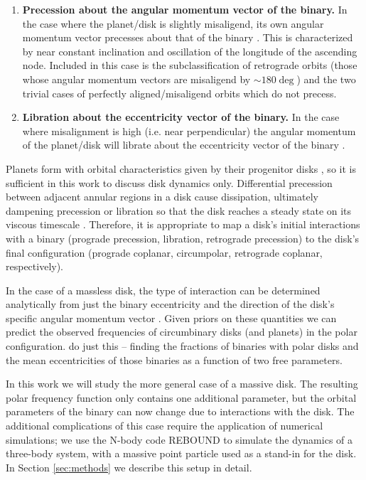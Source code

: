 \documentclass[twocolumn]{aastex631}
\begin{document}
\begin{enumerate}
    \item {\bf Precession about the angular momentum vector of the binary.} In the case where the planet/disk
        is slightly misaligend, its own angular momentum vector precesses about that of the binary \citep[e.g.,][]{bate2000,lubow2000}.
        This is characterized by near constant
        inclination and oscillation of the longitude of the ascending node. Included in this case is the subclassification
        of retrograde orbits (those whose angular momentum vectors are misaligend by $\sim 180 \deg$) and the two
        trivial cases of perfectly aligned/misaligend orbits which do not precess. \label{enum:precession}
    \item {\bf Libration about the eccentricity vector of the binary.} In the case where misalignment is high (i.e. near
    perpendicular) the angular momentum of the planet/disk will librate about the eccentricity vector of the binary 
    \citep[e.g.,][]{verrier2009,farago2010,doolin2011}.
    \label{enum:libration}
\end{enumerate}

Planets form with orbital characteristics given by their progenitor disks \citep[e.g.,][]{childs2021}, so it is sufficient in this work to
discuss disk dynamics only.
Differential precession between adjacent annular regions in a disk cause dissipation, ultimately dampening precession or libration
so that the disk reaches a steady state on its viscous timescale \citep[see also \citet{nixon2011,foucart2013,foucart2014}]{bate2000}. Therefore, it is appropriate to map a disk's
initial interactions with a binary (prograde precession, libration, retrograde precession) to the disk's final configuration
(prograde coplanar, circumpolar, retrograde coplanar, respectively).

In the case of a massless disk, the type of interaction can be determined analytically from just the binary eccentricity and the
direction of the disk's specific angular momentum vector
\citep[parameterized by the disk inclination and its longitude of the ascending node][]{zanazzi2018}.
Given priors on these quantities we can predict the observed frequencies of circumbinary disks (and planets) in the polar configuration.
\citet{ceppi2024} do just this -- finding the fractions of binaries with polar disks and the mean eccentricities of those binaries
as a function of two free parameters.

In this work we will study the more general case of a massive disk. The resulting polar frequency function only contains one
additional parameter, but the orbital parameters of the binary can now change due to interactions with the disk. The additional
complications of this case require the application of numerical simulations; we use the N-body code REBOUND \citep{rebound} to simulate the
dynamics of a three-body system, with a massive point particle used as a stand-in for the disk. In Section \ref{sec:methods}
we describe this setup in detail.
\end{document}
